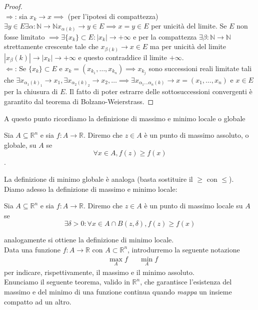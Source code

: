 \begin{proof} \hspace{1cm} \\
$\boxed{\Rightarrow}$: sia $x_k \to x \implies$ (per l'ipotesi di compattezza) $\exists y \in E \exists \alpha: \mathbb{N} \to \mathbb{N} x_{\alpha(k)} \to y \in E \implies x=y \in E$ per unicità del limite. Se $E$ non fosse limitato $\implies \exists \{x_k \} \subset E : |x_k| \to +\infty$ e per la compattezza $\exists \beta: \mathbb{N} \to \mathbb{N}$ strettamente crescente tale che $x_{\beta(k)} \to x \in E$ ma per unicità del limite $|x_\beta(k)| \to |x_k| \to +\infty$ e questo contraddice il limite $+\infty$. \\
$\boxed{\Leftarrow}$: Se $\{ x_ k\} \subset E$ e $x_k = (x_{k_1}, \ldots, x_{k_n}) \implies x_{k_j}$ sono successioni reali limitate tali che $\exists x_{{\alpha_1(k)}_1} \to x_1, \exists x_{{\alpha_2(k)}_2} \to x_2, \ldots \implies 
\exists x_{\alpha_1 \ldots \alpha_n(k)} \to x = (x_1, \ldots, x_n)$ e $x \in E$ per la chiusura di $E$. Il fatto di poter estrarre delle sottosuccessioni convergenti è garantito dal teorema di Bolzano-Weierstrass.
\end{proof}
\noindent A questo punto ricordiamo la definizione di massimo e minimo locale o globale
\begin{definition}
Sia $A \subseteq \mathbb{R}^n$ e sia $f: A \to \mathbb{R}$. Diremo che $z \in A$ è un punto di massimo assoluto, o globale, su $A$ se$$\forall x \in A, f(z) \geq f(x)$$.
\end{definition}
\noindent La definizione di minimo globale è analoga (basta sostituire il $\geq$ con $\leq$). \\
Diamo adesso la definizione di massimo e minimo locale:
\begin{definition}
Sia $A \subseteq \mathbb{R}^n$ e sia $f: A \to \mathbb{R}$. Diremo che $z \in A$ è un punto di massimo locale su $A$ se
$$
\exists \delta > 0: \forall x \in A \cap B(z, \delta), f(z) \geq f(x)
$$
\end{definition}
\noindent analogamente si ottiene la definizione di minimo locale. \\ Data una funzione $f:A \to \mathbb{R}$ con $A \subset \mathbb{R}^n$, introdurremo la seguente notazione 
\begin{align*}
&\max_A{f} & &\min_A{f} 
\end{align*}
per indicare, rispettivamente, il massimo e il minimo assoluto. \\
Enunciamo il seguente teorema, valido in $\mathbb{R}^n$, che garantisce l'esistenza del massimo e del minimo di una funzione continua quando \emph{mappa} un insieme compatto ad un altro. \\
